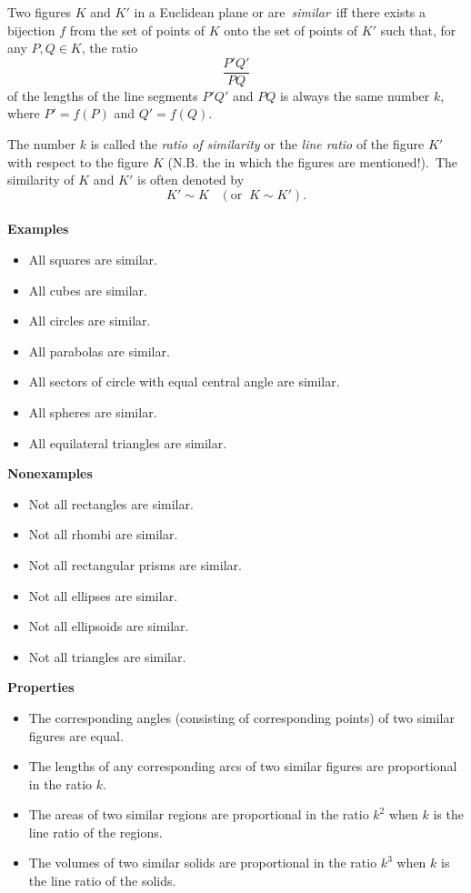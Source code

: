 \documentclass[12pt]{article}
\theoremstyle{definition}
\begin{document}
Two figures $K$ and $K'$ in a Euclidean plane or  are\, {\em similar}\, iff there exists a bijection $f$ from the set of points of $K$ onto the set of points of $K'$ such that, for any $P,Q \in K$, the ratio
$$\frac{P'Q'}{PQ}$$
of the lengths of the line segments $P'Q'$ and $PQ$ is always the same number $k$, where $P'=f(P)$ and $Q'=f(Q)$.

The number $k$ is called the {\em ratio of similarity} or the {\em line ratio} of the figure $K'$ with respect to the figure $K$ (N.B. the  in which the figures are mentioned!).\, The similarity of $K$ and $K'$ is often denoted by
$$K' \sim K\;\;\;(\mbox{or}\;\;K \sim K').$$\\

\textbf{Examples}
\begin{itemize}
\item All squares are similar.
\item All cubes are similar.
\item All circles are similar.
\item All parabolas are similar.
\item All sectors of circle with equal central angle are similar.
\item All spheres are similar.
\item All equilateral triangles are similar.
\end{itemize}

\textbf{Nonexamples}
\begin{itemize}
\item Not all rectangles are similar.
\item Not all rhombi are similar.
\item Not all rectangular prisms are similar.
\item Not all ellipses are similar.
\item Not all ellipsoids are similar.
\item Not all triangles are similar.
\end{itemize}

\textbf{Properties}
\begin{itemize}
\item The corresponding angles (consisting of corresponding points) of two similar figures are equal.
\item The lengths of any corresponding arcs of two similar figures are proportional in the ratio $k$.
\item The areas of two similar regions are proportional in the ratio $k^2$ when $k$ is the line ratio of the regions.
\item The volumes of two similar solids are proportional in the ratio $k^3$ when $k$ is the line ratio of the solids.
\end{itemize}
\end{document}
